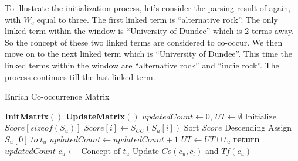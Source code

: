 %

To illustrate the initialization process, let's consider the parsing result of
 again, with $W_c$ equal to three. The first linked
term is ``alternative rock''. The only linked term within the window
is ``University of Dundee'' which is 2 terms away. So the concept of these two
linked terms are considered to co-occur. We then move on
to the next linked term which is ``University of Dundee''. This time the
linked terms within the window are ``alternative rock'' and ``indie rock''. The process continues
till the last linked term.

\begin{algorithm}[th]
\caption{Enrich Co-occurrence Matrix}
\label{enrich}
\begin{algorithmic}[1]
\State \textbf{InitMatrix}$\left(\right)$
\State \textbf{UpdateMatrix}$\left(\right)$
\EndWhile
\EndProcedure
\Statex
{}
\State $updatedCount \leftarrow 0$, $UT \leftarrow \emptyset$
\State Initialize $Score[sizeof(S_u)]$
\State $Score[i] \leftarrow S_{CC}\left(S_u[i]\right)$
\EndFor
\State Sort $Score$ Descending
\State Assign $S_u[0]\;to\;t_u$
\State $updatedCount \leftarrow updatedCount+1$
\State $UT \leftarrow UT \cup t_u$
\EndIf
\EndFor
\EndFor
\State \textbf{return} $updatedCount$
\EndFunction
\Statex
{}
\State $c_u \leftarrow $ Concept of $t_u$
\State Update $Co\left(c_u,c_l\right)$ and $Tf\left(c_u\right)$
\EndFor
\EndFor
\EndProcedure
\end{algorithmic}
\end{algorithm}


